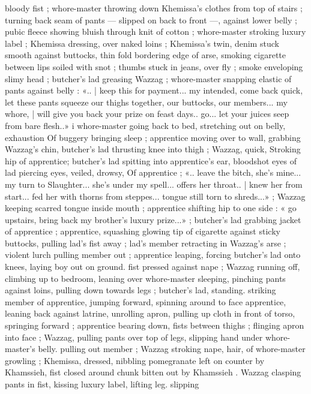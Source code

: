 bloody fist ; whore-master throwing down Khemissa’s clothes from
top of stairs ; turning back seam of pants --- slipped on back to front
---, against lower belly ; pubic fleece showing bluish through knit of
cotton ; whore-master stroking luxury label ; Khemissa dressing, over
naked loins ; Khemissa's twin, denim stuck smooth against buttocks,
thin fold bordering edge of arse, smoking cigarette between lips
soiled with snot ; thumbs stuck in jeans, over fly ; smoke enveloping
slimy head ; butcher's lad greasing Wazzag ; whore-master snapping
elastic of pants against belly : «.. | keep this for payment... my
intended, come back quick, let these pants squeeze our thighs
together, our buttocks, our members... my whore, | will give you back
your prize on feast days.. go... let your juices seep from bare flesh..»
i whore-master going back to bed, stretching out on belly, exhaustion
Of buggery bringing sleep ; apprentice moving over to wall, grabbing
Wazzag’s chin, butcher's lad thrusting knee into thigh ; Wazzag,
quick, Stroking hip of apprentice; butcher's lad spitting into
apprentice’s ear, bloodshot eyes of lad piercing eyes, veiled, drowsy,
Of apprentice ; «.. leave the bitch, she's mine... my turn to
Slaughter... she's under my spell... offers her throat.. | knew her from
start... fed her with thorns from steppes... tongue still torn to
shreds...» ; Wazzag keeping scarred tongue inside mouth ;
apprentice shifting hip to one side : « go upstairs, bring back my
brother's luxury prize...» ; butcher's lad grabbing jacket of
apprentice ; apprentice, squashing glowing tip of cigarette against
sticky buttocks, pulling lad’s fist away ; lad’s member retracting in
Wazzag's arse ; violent lurch pulling member out ; apprentice
leaping, forcing butcher's lad onto knees, laying boy out on ground.
fist pressed against nape ; Wazzag running off, climbing up to
bedroom, leaning over whore-master sleeping, pinching pants
against loins, pulling down towards legs ; butcher's lad, standing.
striking member of apprentice, jumping forward, spinning around to
face apprentice, leaning back against latrine, unrolling apron, pulling
up cloth in front of torso, springing forward ; apprentice bearing
down, fists between thighs ; flinging apron into face ; Wazzag, pulling
pants over top of legs, slipping hand under whore-master’s belly.
pulling out member ; Wazzag stroking nape, hair, of whore-master
growling ; Khemissa, dressed, nibbling pomegranate left on counter
by Khamssieh, fist closed around chunk bitten out by Khamssieh .
Wazzag clasping pants in fist, kissing luxury label, lifting leg. slipping
